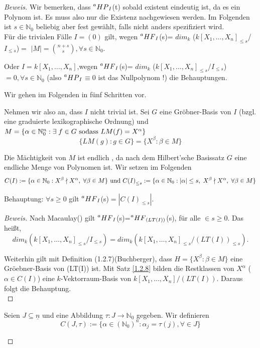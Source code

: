 \documentclass{article}
\newcommand*{\R}{k[X_{1},\ldots,X_{n}]}
\newcommand*{\indx}[2]{{#1}_{#2}}
\newcommand*{\potx}[2]{{#1}^{#2}}
\newcommand*{\N}{\mathbb{N}_0}
\newcommand*{\hf}[1]{$\prescript{a}{}{HF}_{#1}$}
\newcommand*{\hp}[1]{$\prescript{a}{}{HP}_{#1}$}
\begin{document}
\begin{proof}[Beweis]
	Wir bemerken, dass \hp{I}(t) sobald existent eindeutig ist, da es ein Polynom ist. Es muss also nur die Existenz nachgewiesen werden. Im Folgenden ist $s\in \N$ beliebig aber fest gewählt, falls nicht anders spezifiziert wird.\\
	
	Für die trivialen Fälle $I=(0)$ gilt, wegen \hf{I}(s)= $\indx{dim}{k}$ ($\indx{\R}{\leq s}$/$\indx{I}{\leq s}$)$=$ $\left|M\right|=\binom{n+s}{s}, \forall s\in \N$.
	
	Oder $I=\R$,wegen \hf{I}(s)= $\indx{dim}{k}$ ($\indx{\R}{\leq s}$/$\indx{I}{\leq s}$)$=0, \forall s\in \N$  (also \hp{I}$\equiv0$ ist das Nullpolynom !) die Behauptungen.
	
	
	Wir gehen im Folgenden in fünf Schritten vor.\\
	\begin{compactenum}
		
		\item Nehmen wir also an, dass $I$ nicht trivial ist. Sei $G$ eine Gröbner-Basis von $I$ (bzgl. eine graduierte lexikographische Ordnung) und $M=\{\alpha \in \N^n:\exists\;f\in G \textnormal{ sodass } LM(f)=\potx{X}{\alpha}\}$
		\begin{displaymath}
		\{LM(g):g\in G\}=\{\potx{X}{\beta}:\beta \in M \}
		\end{displaymath}
		
		 Die Mächtigkeit von $M$ ist endlich , da nach dem Hilbert'sche Basissatz $G$ eine endliche Menge von Polynomen ist.
		Wir setzen im Folgenden 
		\begin{displaymath}
		C(I):=\{\alpha \in \N: \potx{X}{\beta} \nmid \potx{X}{\alpha},\; \forall \beta \in M \}
		\textnormal{ und } 
		\indx{C(I)}{\leq s}:= \{\alpha \in \N:|\alpha|\leq s, \; \potx{X}{\beta} \nmid \potx{X}{\alpha},\; \forall \beta \in M \}
		\end{displaymath}
		
Behauptung: $\forall s\geq 0$ gilt \hf{I}(s)$=|\indx{C(I)}{\leq s}|$.\\

\begin{proof}[Beweis]
Nach Macaulay() gilt \hf{I}(s)=\hf{(LT(I))}(s), für alle $ \in s\geq0$. Das heißt,
\begin{displaymath}
\indx{dim}{k} (\indx{\R}{\leq s}/\indx{I}{\leq s})=\indx{dim}{k}(\indx{\R}{\leq s}/\indx{(LT(I))}{\leq s}).
\end{displaymath}

Weiterhin gilt mit Definition (1.2.7)(Buchberger), dass $H=\{\potx{X}{\beta}:\beta \in M \}$ eine Gröebner-Basis von (LT(I)) ist. Mit Satz \ref{1.2.8} bilden die Restklassen von $\potx{X}{\alpha}$ ($\alpha\in C(I)$) eine $k$-Vektorraum-Basis von $\R/(LT(I))$. Daraus folgt die Behauptung.\\
\end{proof}
\item Seien $J\subseteq \underline{n}$ und eine Abbildung $\tau:J\longrightarrow \N$ gegeben. Wir definieren
\begin{displaymath}
C(J,\tau):=\{\alpha \in (\N)^n: \indx{\alpha}{j}=\tau(j), \forall \in J  \}
\end{displaymath}


\end{compactenum}
\end{proof}
\end{document}
